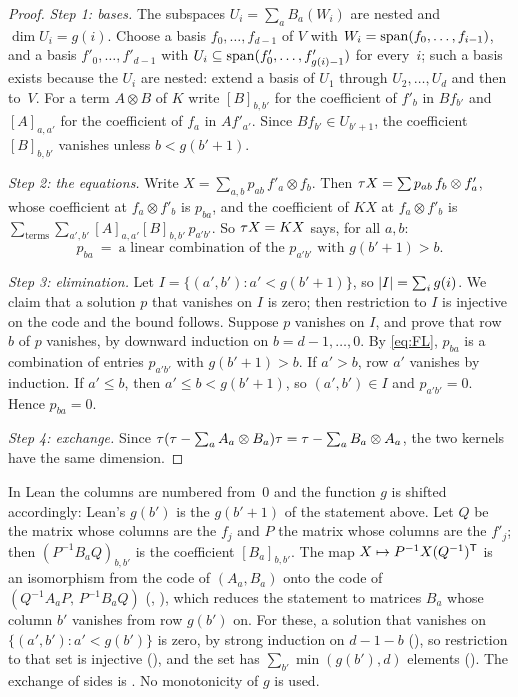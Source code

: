 \begin{proof}
\emph{Step 1: bases.} The subspaces $U_i=\sum_aB_a(W_i)$ are nested and $\dim U_i=g(i)$. Choose a basis
$f_0,\dots,f_{d-1}$ of $V$ with $W_i=\operatorname{span}(f_0,\dots,f_{i-1})$, and a basis $f'_0,\dots,f'_{d-1}$ with
$U_i\subseteq\operatorname{span}(f'_0,\dots,f'_{g(i)-1})$ for every~$i$; such a basis exists because the $U_i$ are nested: extend a
basis of $U_1$ through $U_2,\dots,U_d$ and then to~$V$. For a term $A\otimes B$ of $K$ write $[B]_{b,b'}$ for the
coefficient of $f'_b$ in $Bf_{b'}$ and $[A]_{a,a'}$ for the coefficient of $f_a$ in $Af'_{a'}$. Since
$Bf_{b'}\in U_{b'+1}$, the coefficient $[B]_{b,b'}$ vanishes unless $b<g(b'+1)$.

\emph{Step 2: the equations.} Write $X=\sum_{a,b}p_{ab}\,f'_a\otimes f_b$. Then $\tau X=\sum p_{ab}\,f_b\otimes f'_a$, whose
coefficient at $f_a\otimes f'_b$ is $p_{ba}$, and the coefficient of $KX$ at $f_a\otimes f'_b$ is
$\sum_{\text{terms}}\sum_{a',b'}[A]_{a,a'}[B]_{b,b'}\,p_{a'b'}$. So $\tau X=KX$ says, for all $a,b$:
\begin{equation}\label{eq:FL}
  p_{ba}\ =\ \text{a linear combination of the }p_{a'b'}\text{ with }g(b'+1)>b .
\end{equation}

\emph{Step 3: elimination.} Let $I=\{(a',b'):a'<g(b'+1)\}$, so $\lvert I \rvert=\sum_ig(i)$. We claim that a solution $p$ that
vanishes on $I$ is zero; then restriction to $I$ is injective on the code and the bound follows. Suppose $p$ vanishes on
$I$, and prove that row $b$ of $p$ vanishes, by downward induction on $b=d-1,\dots,0$. By \eqref{eq:FL}, $p_{ba}$ is a
combination of entries $p_{a'b'}$ with $g(b'+1)>b$. If $a'>b$, row $a'$ vanishes by induction. If $a'\le b$, then
$a'\le b<g(b'+1)$, so $(a',b')\in I$ and $p_{a'b'}=0$. Hence $p_{ba}=0$.

\emph{Step 4: exchange.} Since $\tau(\tau-\sum_aA_a\otimes B_a)\tau=\tau-\sum_aB_a\otimes A_a$, the two kernels have the same
dimension.
\end{proof}

\begin{outline}
In Lean the columns are numbered from~$0$ and the function $g$ is shifted accordingly: Lean's $g(b')$ is the $g(b'+1)$
of the statement above. Let $Q$ be the matrix whose columns are the $f_j$ and $P$ the matrix whose columns are the
$f'_j$; then $(P^{-1}B_aQ)_{b,b'}$ is the coefficient $[B_a]_{b,b'}$. The map $X\mapsto P^{-1}X(Q^{-1})^{\mathsf{T}}$ is an
isomorphism from the code of $(A_a,B_a)$ onto the code of $(Q^{-1}A_aP,\,P^{-1}B_aQ)$ (,
), which reduces the statement to matrices $B_a$ whose column $b'$ vanishes from row
$g(b')$ on. For these, a solution that vanishes on $\{(a',b'):a'<g(b')\}$ is zero, by strong induction on $d-1-b$
(), so restriction to that set is injective
(), and the set has $\sum_{b'}\min(g(b'),d)$ elements (). The
exchange of sides is . No monotonicity of $g$ is used.
\end{outline}

